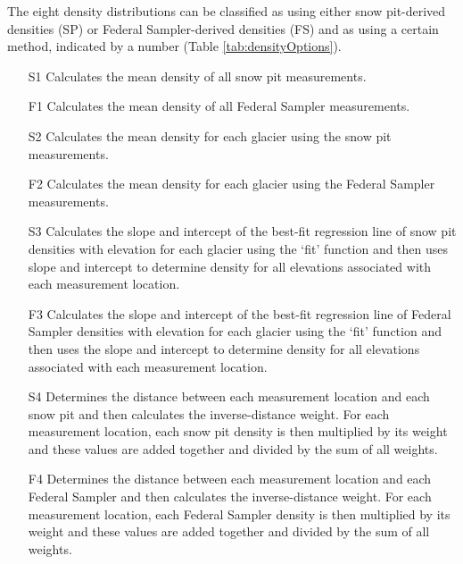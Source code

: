 \documentclass{sfuthesis}
\begin{document}
The eight density distributions can be classified as using either snow pit-derived densities (SP) or Federal Sampler-derived densities (FS) and as using a certain method, indicated by a number (Table \ref{tab:densityOptions}).
\begin{itemize}
	\item[S1] Calculates the mean density of all snow pit measurements.
	\item[F1] Calculates the mean density of all Federal Sampler measurements.
	\item[S2] Calculates the mean density for each glacier using the snow pit measurements. 
	\item[F2] Calculates the mean density for each glacier using the Federal Sampler measurements. 
	\item[S3] Calculates the slope and intercept of the best-fit regression line of snow pit densities with elevation for each glacier using the `fit' function and then uses slope and intercept to determine density for all elevations associated with each measurement location.
	\item[F3] Calculates the slope and intercept of the best-fit regression line of Federal Sampler densities with elevation for each glacier using the `fit' function and then uses the slope and intercept to determine density for all elevations associated with each measurement location.
	\item[S4] Determines the distance between each measurement location and each snow pit and then calculates the inverse-distance weight. For each measurement location, each snow pit density is then multiplied by its weight and these values are added together and divided by the sum of all weights. 
	\item[F4] Determines the distance between each measurement location and each Federal Sampler and then calculates the inverse-distance weight. For each measurement location, each Federal Sampler density is then multiplied by its weight and these values are added together and divided by the sum of all weights. 
	\end{itemize}
\end{document}
